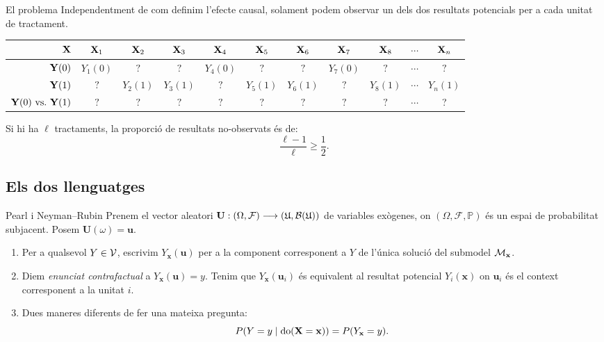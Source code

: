 \documentclass{bestbeamer}
\begin{document}
\begin{frame}{El problema}
Independentment de com definim l'efecte causal, solament podem observar un dels dos resultats potencials per a cada unitat de tractament.
\begin{table}[H]
  \centering
  \begin{tabular}{r|cccccccccc}
    \toprule
    $\mathbf{X}$ & $\mathbf{X}_1$ & $\mathbf{X}_2$ & $\mathbf{X}_3$ & $\mathbf{X}_4$ & $\mathbf{X}_5$ & $\mathbf{X}_6$ & $\mathbf{X}_7$ & $\mathbf{X}_8$ & $\dotsb$ & $\mathbf{X}_n$ \\ \hline
    $\mathbf{Y}(0)$ & $Y_1(0)$ & $?$ & $?$ & $Y_4(0)$ & $?$ & $?$ & $Y_7(0)$ & $?$ & $\dotsb$ & $?$ \\ \hline
    $\mathbf{Y}(1)$ & $?$ & $Y_2(1)$ & $Y_3(1)$ & $?$ & $Y_5(1)$ & $Y_6(1)$ & $?$ & $Y_8(1)$ & $\dotsb$ & $Y_n(1)$ \\ \hline
    $\YY(0)\ \text{vs.}\ \YY(1)$ & $?$ & $?$ & $?$ & $?$ & $?$ & $?$ & $?$ & $?$ & $\dotsb$ & ?  \\
    \bottomrule
  \end{tabular}
  \label{tab:potential-outcomes}
\end{table}
Si hi ha $\ell$ tractaments, la proporció de resultats no-observats és de:
\begin{equation*}
  \frac{\ell-1}{\ell}\geq\frac{1}{2}.
\end{equation*}
\end{frame}

\subsection{Els dos llenguatges}

\begin{frame}{Pearl i Neyman--Rubin}\label{frame:neymanrubin}
Prenem el vector aleatori $\mathbf{U}:(\Omega,\mathcal F)\longrightarrow(\mathfrak U,\mathcal B(\mathfrak U))$ de variables exògenes, on $(\Omega,\mathcal{F},\mathbb{P})$ és un espai de probabilitat subjacent. Posem $\mathbf{U}(\omega)=\mathbf{u}$.
\begin{notation}\label{not:submodel-galles-pearl}
\begin{enumerate}
  \item Per a qualsevol $Y\in\mathcal{V}$, escrivim $Y_{\mathbf x}(\mathbf u)$ per a la component corresponent a $Y$ de l'única solució del submodel $\mathcal{M}_{\mathbf x}$. 
  \item Diem \textit{enunciat contrafactual} a $Y_{\mathbf x}(\mathbf u)=y$. Tenim que $Y_{\mathbf x}(\mathbf u_i)$ és equivalent al resultat potencial $Y_i(\mathbf x)$ on $\mathbf{u}_i$ és el context corresponent a la unitat $i$.
  \item Dues maneres diferents de fer una mateixa pregunta:
  \begin{equation*}
    P(Y=y\mid\operatorname{do}(\mathbf{X}=\mathbf{x}))=P(Y_{\mathbf{x}}=y).
  \end{equation*}
\end{enumerate}
\end{notation}
\vfill
\hfill{}
\end{frame}
\end{document}
